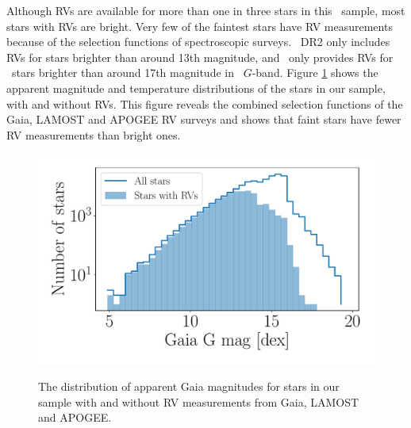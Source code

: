 Although RVs are available for more than one in three stars in this \kepler\
sample, most stars with RVs are bright.
Very few of the faintest stars have RV measurements because of the selection
functions of spectroscopic surveys.
\gaia\ DR2 only includes RVs for stars brighter than around 13th magnitude,
and \lamost\ only provides RVs for \kepler\ stars brighter than around 17th
magnitude in \gaia\ $G$-band.
Figure \ref{fig:rv_histogram} shows the apparent magnitude and temperature
distributions of the stars in our sample, with and without RVs.
This figure reveals the combined selection functions of the Gaia, LAMOST and
APOGEE RV surveys and shows that faint stars have fewer RV measurements than
bright ones.
\begin{figure}[ht!]
\caption{
    The distribution of apparent Gaia magnitudes for
    stars in our sample with and without RV measurements from Gaia, LAMOST and
    APOGEE.
}
  \centering \includegraphics[width=.5\textwidth]{rv_histogram}
\label{fig:rv_histogram}
\end{figure}

